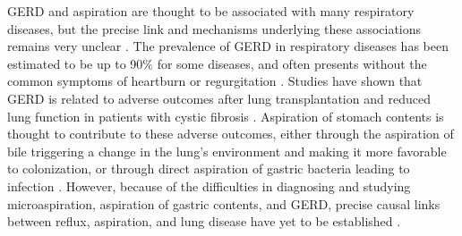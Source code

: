 \documentclass[12pt]{article}
\begin{document}
GERD and aspiration are thought to be associated with many respiratory diseases, but the precise 
link and mechanisms underlying these associations remains very unclear 
\cite{houghton-microaspiration-2016}. The prevalence of GERD in 
respiratory diseases has been estimated to be up to 90\% for some 
diseases, and often presents without the common symptoms of heartburn 
or regurgitation \cite{houghton-microaspiration-2016}. Studies have 
shown that GERD is related to adverse outcomes after lung 
transplantation \cite{sweet-gerd_asp-2009} and reduced lung function in patients with 
cystic fibrosis \cite{almomani-cf_sputum-2016}. Aspiration of stomach 
contents is thought to contribute to these adverse outcomes, either 
through the aspiration of bile triggering a change in the lung's 
environment and making it more favorable to colonization, or through 
direct aspiration of gastric bacteria leading to infection 
\cite{reen-aspirated_bile-2014, almomani-cf_sputum-2016}. 
However, because of the difficulties in diagnosing and studying 
microaspiration, aspiration of gastric contents, and GERD, precise 
causal links between reflux, aspiration, and lung disease have yet to 
be established \cite{houghton-microaspiration-2016, almomani-cf_sputum-2016}.
\end{document}
